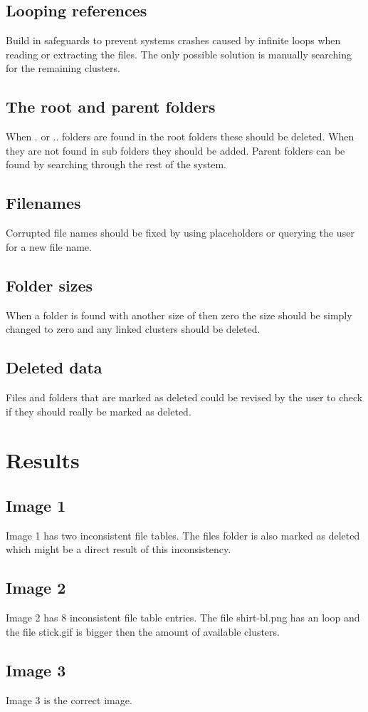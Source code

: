 \documentclass[pdftex,12pt,a4paper]{article}
\begin{document}
\subsection{Looping references}
Build in safeguards to prevent systems crashes caused by infinite loops when reading or extracting the files. The only possible solution is manually searching for the remaining clusters.
\subsection{The root and parent folders}
When . or .. folders are found in the root folders these should be deleted. When they are not found in sub folders they should be added. Parent folders can be found by searching through the rest of the system.
\subsection{Filenames}
Corrupted file names should be fixed by using placeholders or querying the user for a new file name.
\subsection{Folder sizes}
When a folder is found with another size of then zero the size should be simply changed to zero and any linked clusters should be deleted.
\subsection{Deleted data}
Files and folders that are marked as deleted could be revised by the user to check if they should really be marked as deleted.

\section{Results}
\subsection{Image 1}
Image 1 has two inconsistent file tables. The files folder is also marked as deleted which might be a direct result of this inconsistency. 
\subsection{Image 2}
Image 2 has 8 inconsistent file table entries. The file shirt-bl.png has an loop and the file stick.gif is bigger then the amount of available clusters.
\subsection{Image 3}
Image 3 is the correct image. 
\end{document}
